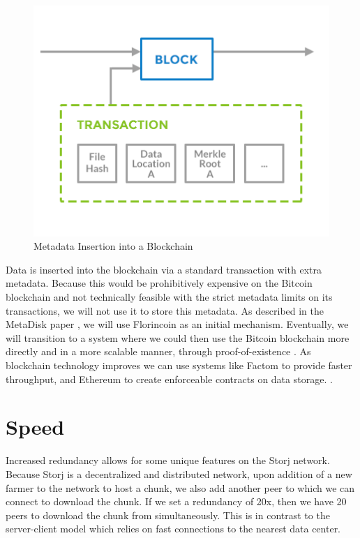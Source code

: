 \documentclass[a4paper,10pt]{article}
\begin{document}
\begin{figure}[h!]
\centering
\includegraphics[width=\linewidth]{6}
\caption{Metadata Insertion into a Blockchain}
\end{figure}

Data is inserted into the blockchain via a standard transaction with extra metadata. Because this would be prohibitively expensive on the Bitcoin blockchain and not technically feasible with the strict metadata limits on its transactions, we will not use it to store this metadata. As described in the MetaDisk paper \cite{1}, we will use Florincoin \cite{6} as an initial mechanism. Eventually, we will transition to a system where we could then use the Bitcoin blockchain more directly and in a more scalable manner, through proof-of-existence \cite{4} \cite{5} \cite{7}. As blockchain technology improves we can use systems like Factom \cite{7} to provide faster throughput, and Ethereum \cite{22} to create enforceable contracts on data storage.  .  

\section{Speed}
Increased redundancy allows for some unique features on the Storj network. Because Storj is a decentralized and distributed network, upon addition of a new farmer to the network to host a chunk, we also add another peer to which we can connect to download the chunk. If we set a redundancy of 20x, then we have 20 peers to download the chunk from simultaneously. This is in contrast to the server-client model which relies on fast connections to the nearest data center.\\
\end{document}
